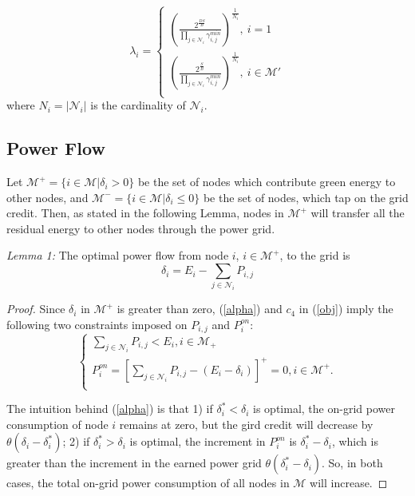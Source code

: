 \documentclass[journal,12pt,onecolumn]{IEEEtran}
\begin{document}
\begin{equation}\label{2a1}
\lambda_{i}=\left\{\begin{array}{l}
{\left({\frac{2^{\frac{DS}{B}}}{\prod\limits_{j\in\mathcal{N}_{i}}{\gamma ^{min}_{i,j}}}}\right)}^{\frac{1}{{N}_{i}}},\: i=1\\
{\left({\frac{2^{\frac{S}{B}}}{\prod\limits_{j\in\mathcal{N}_{i}}{\gamma ^{min}_{i,j}}}}\right)}^{\frac{1}{{N}_{i}}},\: i\in\mathcal{M'}\\
\end{array}
\right.
\end{equation}
where $N_i=|\mathcal{N}_i|$ is the cardinality of $\mathcal{N}_i$.\subsection{Power Flow}
Let $\mathcal{M}^{+}=\{i\in\mathcal{M}|\delta_i>0\}$ be the set of nodes which contribute green energy to other nodes, and $\mathcal{M}^{-}=\{i\in\mathcal{M}|\delta_i\le 0\}$ be the set of nodes, which tap on the grid credit. Then,  as stated in the following Lemma, nodes in $\mathcal{M}^+$ will transfer all the residual energy to other nodes through the power grid.

\emph{Lemma 1:} The optimal power flow from node $i$, $i\in\mathcal{M}^+$, to the grid is 
\begin{equation}\label{alpha}
\delta_i=E_i-\sum\limits_{j\in\mathcal{N}_i}P_{i,j}\end{equation}
\begin{proof}
Since $\delta_i$ in $\mathcal{M}^+$ is greater than zero, (\ref{alpha}) and $c_4$ in (\ref{obj}) imply the following two constraints imposed on $P_{i,j}$ and $P_i^{on}$:
\begin{equation}\label{ana1}
\left\{\begin{array}{l}
\sum\limits_{j\in\mathcal{N}_i}P_{i,j}<E_i,i\in\mathcal{M}_{+}\\
P_i^{on}=\left[\sum\limits_{j \in\mathcal{N}_i} {{P_{i,j}}} - (E_i-\delta_i)\right]^+=0,i\in\mathcal{M}^+.\\
\end{array}\right.
\end{equation}

The intuition behind (\ref{alpha}) is that 1) if $\delta_i^*<\delta_i$ is optimal, the on-grid power consumption of node $i$ remains at zero, but the gird credit will decrease by $\theta(\delta_i-\delta_i^*)$; 2) if $\delta_i^*>\delta_i$ is optimal, the increment in $P_i^{on}$ is $\delta_i^*-\delta_i$, which is greater than the increment in the earned power grid $\theta(\delta_i^*-\delta_i)$. So, in both cases, the total on-grid power consumption of all nodes in $\mathcal{M}$ will increase. 
\end{proof}
\end{document}
